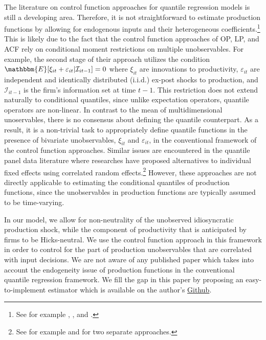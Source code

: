 \documentclass[12pt]{article}
\begin{document}
The literature on control function approaches for quantile regression models is still a developing area. Therefore, it is not straightforward to estimate production functions by allowing for endogenous inputs and their heterogeneous coefficients.\footnote{See for example \cite{Chesher2003}, \cite{Ma2006}, and \cite{Lee2007}.} This is likely due to the fact that the control function approaches of OP, LP, and ACF rely on conditional moment restrictions on multiple unobservables. For example, the second stage of their approach utilizes the condition $\mathbbm{E}[\xi_{it}+\varepsilon_{it}|\mathcal{I}_{it-1}]=0$ where $\xi_{it}$ are innovations to productivity, $\varepsilon_{it}$ are independent and identically distributed (i.i.d.) ex-post shocks to production, and $\mathcal{I}_{it-1}$ is the firm's information set at time $t-1$. This restriction does not extend naturally to conditional quantiles, since unlike expectation operators, quantile operators are non-linear. In contrast to the mean of multidimensional unoservables, there is no consensus about defining the quantile counterpart. As a result, it is a non-trivial task to appropriately define quantile functions in the presence of bivariate unobservables, $\xi_{it}$ and $\varepsilon_{it}$, in the conventional framework of the control function approaches. Similar issues are encountered in the quantile panel data literature where researches have proposed alternatives to individual fixed effects using correlated random effects.\footnote{See for example \cite{Harding2016} and \cite{Cai2018} for two separate approaches.} However, these approaches are not directly applicable to estimating the conditional quantiles of production functions, since the unobservables in production functions are typically assumed to be time-varying.

In our model, we allow for non-neutrality of the unobserved idiosyncratic production shock, while the component of productivity that is anticipated by firms to be Hicks-neutral.  We use the control function approach in this framework in order to control for the part of production unobservables that are correlated with input decisions. We are not aware of any published paper which takes into account the endogeneity issue of production functions in the conventional quantile regression framework. We fill the gap in this paper by proposing an easy-to-implement estimator which is available on the author's \href{https://github.com/justdoty/Quantile-Production-Functions}{Github}. 
\end{document}
